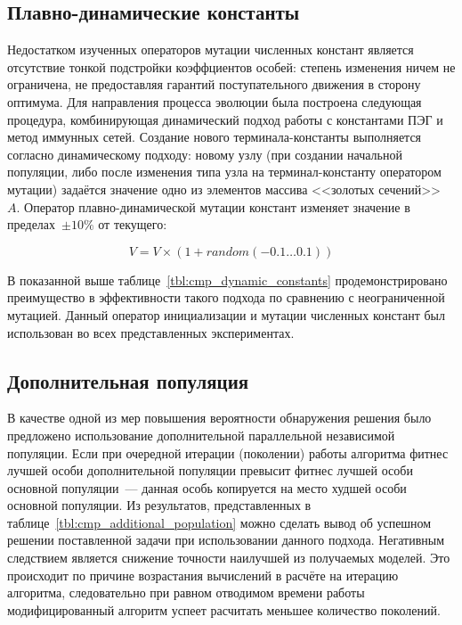 
\subsection{Плавно-динамические константы}

Недостатком изученных операторов мутации численных констант является отсутствие тонкой подстройки коэффциентов особей: степень изменения ничем не ограничена, не предоставляя гарантий поступательного движения в сторону оптимума. Для направления процесса эволюции была построена следующая процедура, комбинирующая динамический подход работы с константами ПЭГ и метод иммунных сетей. Создание нового терминала-константы выполняется согласно динамическому подходу: новому узлу (при создании начальной популяции, либо после изменения типа узла на терминал-константу оператором мутации) задаётся значение одно из элементов массива <<золотых сечений>>~$A$. Оператор плавно-динамической мутации констант изменяет значение в пределах~$\pm10\%$ от текущего:

\begin{equation}
\label{eq:zerg_const_mutation}
V = V \times (1 + random(-0.1\ldots0.1))
\end{equation}

В показанной выше таблице~\ref{tbl:cmp_dynamic_constants} продемонстрировано преимущество в эффективности такого подхода по сравнению с неограниченной мутацией. Данный оператор инициализации и мутации численных констант был использован во всех представленных экспериментах.


\subsection{Дополнительная популяция}

В качестве одной из мер повышения вероятности обнаружения решения было предложено использование дополнительной параллельной независимой популяции. Если при очередной итерации (поколении) работы алгоритма фитнес лучшей особи дополнительной популяции превысит фитнес лучшей особи основной популяции~--- данная особь копируется на место худшей особи основной популяции. Из результатов, представленных в таблице~\ref{tbl:cmp_additional_population} можно сделать вывод об успешном решении поставленной задачи при использовании данного подхода. Негативным следствием является снижение точности наилучшей из получаемых моделей. Это происходит по причине возрастания вычислений в расчёте на итерацию алгоритма, следовательно при равном отводимом времени работы модифицированный алгоритм успеет расчитать меньшее количество поколений.

